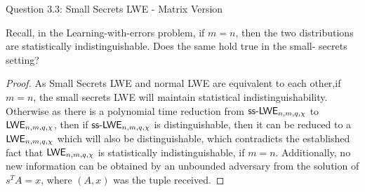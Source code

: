 \begin{solution}{Question 3.3: Small Secrets LWE - Matrix Version}\label{ques:33}
    \begin{question}
    Recall, in the Learning-with-errors problem, if $m = n$, then the two distributions are statistically indistinguishable. Does the same hold true in the small- secrets setting?
    \end{question}
    \tcblower{}
    \begin{proof}
    As Small Secrets LWE and normal LWE are equivalent to each other,if $m=n$, the small secrets LWE will maintain statistical indistinguishability. Otherwise as there is a polynomial time reduction from $\mathsf{ss\text{-}LWE}_{n,m,q,\chi}$ to $\mathsf{LWE}_{n,m,q,\chi}$, then if $\mathsf{ss\text{-}LWE}_{n,m,q,\chi}$ is distinguishable, then it can be reduced to a $\mathsf{LWE}_{n,m,q,\chi}$ which will also be distinguishable, which contradicts the established fact that $\mathsf{LWE}_{n,m,q,\chi}$ is statistically indistinguishable, if $m=n$. Additionally, no new information can be obtained by an unbounded adversary from the solution of $s^TA = x$, where $(A, x)$ was the tuple received.
    \end{proof}
\end{solution}
